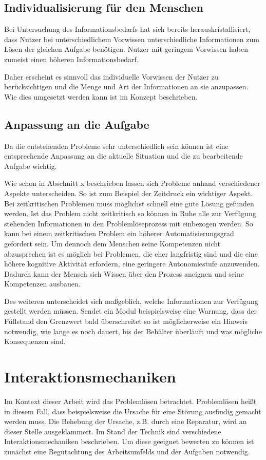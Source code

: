 \subsection{Individualisierung für den Menschen}
Bei Untersuchung des Informationsbedarfs hat sich bereits herauskristallisiert, dass Nutzer bei unterschiedlichem Vorwissen unterschiedliche Informationen zum Lösen der gleichen Aufgabe benötigen. Nutzer mit geringem Vorwissen haben zumeist einen höheren Informationsbedarf.

Daher erscheint es sinnvoll das individuelle Vorwissen der Nutzer zu berücksichtigen und die Menge und Art der Informationen an sie anzupassen. Wie dies umgesetzt werden kann ist im Konzept beschrieben.

\subsection{Anpassung an die Aufgabe}
Da die entstehenden Probleme sehr unterschiedlich sein können ist eine entsprechende Anpassung an die aktuelle Situation und die zu bearbeitende Aufgabe wichtig.

Wie schon in Abschnitt x beschrieben lassen sich Probleme anhand verschiedener Aspekte unterscheiden. So ist zum Beispiel der Zeitdruck ein wichtiger Aspekt. Bei zeitkritischen Problemen muss möglichst schnell eine gute Lösung gefunden werden. Ist das Problem nicht zeitkritisch so können in Ruhe alle zur Verfügung stehenden Informationen in den Problemlöseprozess mit einbezogen werden. So kann bei einem zeitkritischen Problem ein höherer Automatisierungsgrad gefordert sein. Um dennoch dem Menschen seine Kompetenzen nicht abzusprechen ist es möglich bei Problemen, die eher langfristig sind und die eine höhere kognitive Aktivität erfordern, eine geringere Autonomiestufe anzuwenden. Dadurch kann der Mensch sich Wissen über den Prozess aneignen und seine Kompetenzen ausbauen. 

Des weiteren unterscheidet sich maßgeblich, welche Informationen zur Verfügung gestellt werden müssen. Sendet ein Modul beispielsweise eine Warnung, dass der Füllstand den Grenzwert bald überschreitet so ist möglicherweise ein Hinweis notwendig, wie lange es noch dauert, bis der Behälter überläuft und was mögliche Konsequenzen sind. 

\section{Interaktionsmechaniken}
Im Kontext dieser Arbeit wird das Problemlösen betrachtet. Problemlösen heißt in diesem Fall, dass beispielsweise die Ursache für eine Störung ausfindig gemacht werden muss. Die Behebung der Ursache, z.B. durch eine Reparatur, wird an dieser Stelle ausgeklammert. Im Stand der Technik sind verschiedene Interaktionsmechaniken beschrieben. Um diese geeignet bewerten zu können ist zunächst eine Begutachtung des Arbeitsumfelds und der Aufgaben notwendig. 

